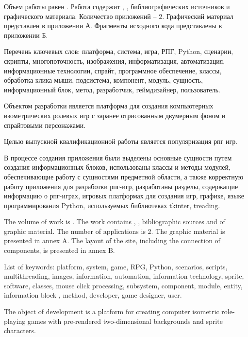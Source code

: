 
Объем работы равен . Работа содержит , ,  библиографических источников и  графического материала. Количество приложений – 2. Графический материал представлен в приложении А. Фрагменты исходного кода представлены в приложении Б.

Перечень ключевых слов: платформа, система, игра, РПГ, Python, сценарии, скрипты, многопоточность, изображения, информатизация, автоматизация, информационные технологии, спрайт,  программное обеспечение, классы, обработка клика мыши, подсистема, компонент, модуль, сущность, информационный блок, метод, разработчик, геймдизайнер, пользователь.

Объектом разработки является платформа для создания компьютерных изометрических ролевых игр с заранее отрисованным двумерным фоном и спрайтовыми персонажами.

Целью выпускной квалификационной работы является популяризация рпг игр.

В процессе создания приложения были выделены основные сущности путем создания информационных блоков, использованы классы и методы модулей, обеспечивающие работу с сущностями предметной области, а также корректную работу приложения для разработки рпг-игр, разработаны разделы, содержащие информацию о рпг-играх, игровых платформах для создания игр, графике, языке программирования Python, используемых библиотеках tkinter, treading.

  
The volume of work is . The work contains , ,  bibliographic sources and  of graphic material. The number of applications is 2. The graphic material is presented in annex A. The layout of the site, including the connection of components, is presented in annex B.

List of keywords: platform, system, game, RPG, Python, scenarios, scripts, multithreading, images, information, automation, information technology, sprite, software, classes, mouse click processing, subsystem, component, module, entity, information block , method, developer, game designer, user.

The object of development is a platform for creating computer isometric role-playing games with pre-rendered two-dimensional backgrounds and sprite characters.

